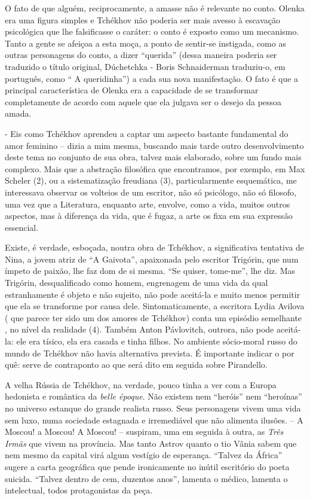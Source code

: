 O fato de que alguém, reciprocamente, a amasse não é relevante no conto.
Olenka era uma figura simples e Tchékhov não poderia ser mais avesso à
escavação psicológica que lhe falsificasse o caráter: o conto é exposto
como um mecanismo. Tanto a gente se afeiçoa a esta moça, a ponto de
sentir-se instigada, como as outras personagens do conto, a dizer
``querida'' (dessa maneira poderia ser traduzido o título original,
Dúchetchka - Boris Schnaiderman traduziu-o, em português, como `` A
queridinha'') a cada sua nova manifestação. O fato é que a principal
característica de Olenka era a capacidade de se transformar
completamente de acordo com aquele que ela julgava ser o desejo da
pessoa amada.

- Eis como Tchékhov aprendeu a captar um aspecto bastante fundamental do
amor feminino -- dizia a mim mesma, buscando mais tarde outro
desenvolvimento deste tema no conjunto de sua obra, talvez mais
elaborado, sobre um fundo mais complexo. Mais que a abstração filosófica
que encontramos, por exemplo, em Max Scheler (2), ou a sistematização
freudiana (3), particularmente esquemática, me interessava observar os
volteios de um escritor, não só psicólogo, não só filosofo, uma vez que
a Literatura, enquanto arte, envolve, como a vida, muitos outros
aspectos, mas à diferença da vida, que é fugaz, a arte os fixa em sua
expressão essencial.

Existe, é verdade, esboçada, noutra obra de Tchékhov, a significativa
tentativa de Nina, a jovem atriz de ``A Gaivota'', apaixonada pelo
escritor Trigórin, que num ímpeto de paixão, lhe faz dom de si mesma.
``Se quiser, tome-me'', lhe diz. Mas Trigórin, desqualificado como
homem, engrenagem de uma vida da qual estranhamente é objeto e não
sujeito, não pode aceitá-la e muito menos permitir que ela se transforme
por causa dele. Sintomaticamente, a escritora Lydia Avilova ( que parece
ter sido um dos amores de Tchékhov) conta um episódio semelhante , no
nível da realidade (4). Também Anton Pávlovitch, outrora, não pode
aceitá-la: ele era tísico, ela era casada e tinha filhos. No ambiente
sócio-moral russo do mundo de Tchékhov não havia alternativa prevista. É
importante indicar o por quê: serve de contraponto ao que será dito em
seguida sobre Pirandello.

A velha Rússia de Tchékhov, na verdade, pouco tinha a ver com a Europa
hedonista e romântica da \emph{belle époque}. Não existem nem ``heróis''
nem ``heroínas'' no universo estanque do grande realista russo. Seus
personagens vivem uma vida sem luxo, numa sociedade estagnada e
irremediável que não alimenta ilusões. -- A Moscou! a Moscou! A Moscou!
-- suspiram, uma em seguida à outra, as \emph{Três Irmãs} que vivem na
província. Mas tanto Astrov quanto o tio Vânia sabem que nem mesmo da
capital virá algum vestígio de esperança. ``Talvez da África'' sugere a
carta geográfica que pende ironicamente no inútil escritório do poeta
suicida. ``Talvez dentro de cem, duzentos anos'', lamenta o médico,
lamenta o intelectual, todos protagonistas da peça.

